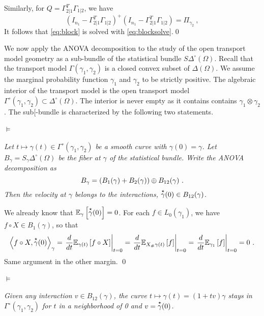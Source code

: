 \documentclass[runningheads]{llncs}
\begin{document}
Similarly, for $Q = \Gamma_{2|1}^T\Gamma_{1|2}$, we have
%
\begin{equation*}
  (I_{n_1}-\Gamma_{2|1}^T\Gamma_{1|2})^{+}(I_{n_1}-\Gamma_{2|1}^T\Gamma_{1|2}) = \Pi_{\gamma_2} \ ,
\end{equation*}
%
It follows that \cref{eq:block} is solved with \cref{eq:blocksolve}.\qed

We now apply the ANOVA decomposition to the study of the open transport model geometry as a sub-bundle of the statistical bundle $S\Delta^\circ(\Omega)$. Recall that the transport model $\Gamma(\gamma_1,\gamma_2)$ is a closed convex subset of $\Delta(\Omega)$. We assume the marginal probability function $\gamma_1$ and $\gamma_2$ to be strictly positive. The algebraic interior of the transport model is the open transport model $\Gamma^\circ(\gamma_1,\gamma_2) \subset \Delta^\circ(\Omega)$. The interior is never empty as it contains  contains $\gamma_1 \otimes \gamma_2$. The sub[-bundle is characterized by the following two statements.

\paragraph{$\bm\models$} \emph{Let $t \mapsto \gamma(t) \in \Gamma^\circ(\gamma_1,\gamma_2)$ be a smooth curve with $\gamma(0)=\gamma$. Let $B_\gamma = S_\gamma \Delta^\circ(\Omega)$ be the fiber at $\gamma$ of the statistical bundle. Write the ANOVA decomposition as
  \begin{equation*}
    B_{\gamma} = (B_1(\gamma) + B_2(\gamma)) \oplus B_{12}(\gamma) \ .
  \end{equation*}
  Then the velocity at $\gamma$ belongs to the interactions, $\overset{\star}{\gamma}(0) \in B_{12}(\gamma)$.}


We already know that ${\operatorname{\mathbb E}}_{\gamma}\left[\overset{\star}{\gamma}(0)\right] = 0$. For each $f \in L_0(\gamma_1)$, we have $f \circ X \in B_1(\gamma)$, so that 
%
    \begin{equation*}
    \left\langle f \circ X , \overset{\star}{\gamma}(0) \right\rangle_{\gamma} = \left. \frac{d}{dt} {\operatorname{\mathbb E}}_{\gamma(t)}\left[f \circ X\right] \right|_{t=0} = \left. \frac{d}{dt} {\operatorname{\mathbb E}}_{X_{\#}\gamma(t)}\left[f\right] \right|_{t=0} = \left. \frac{d}{dt} {\operatorname{\mathbb E}}_{\gamma_1}\left[f\right] \right|_{t=0} = 0 \ .
    \end{equation*}
%
Same argument in the other margin. \qed

\paragraph{$\bm\models$} \emph{Given any interaction $v \in B_{12}(\gamma)$, the curve $t \mapsto \gamma(t) = (1+tv)\gamma$ stays in $\Gamma^\circ(\gamma_1,\gamma_2)$ for $t$ in a neighborhood of 0 and $v = \overset{\star}{\gamma}(0)$.} 
\end{document}
